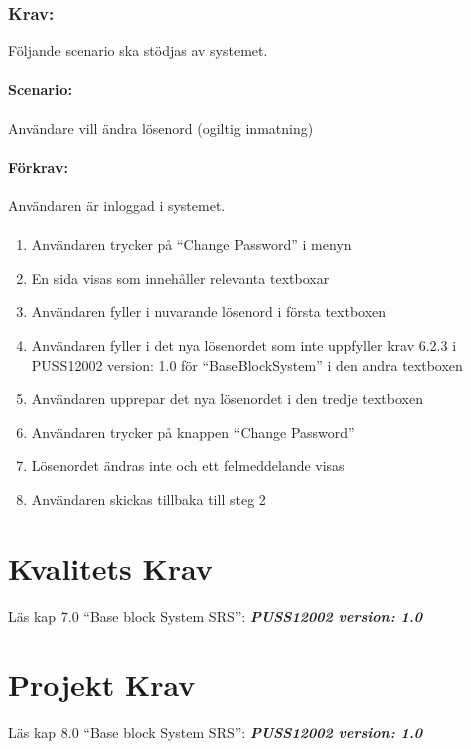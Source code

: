 \documentclass[paper=a4, fontsize=11pt,twoside]{article}
\begin{document}
	\subsubsection{Krav:}Följande scenario ska stödjas av systemet.
	\paragraph{Scenario:}Användare vill ändra lösenord (ogiltig inmatning)
	\paragraph{Förkrav:}
	Användaren är inloggad i systemet.
	\paragraph{}
	\begin{enumerate}
		\item  Användaren trycker på “Change Password” i menyn
		\item	 En sida visas som innehåller relevanta textboxar
		\item	Användaren fyller i nuvarande lösenord i första textboxen
		\item	Användaren fyller i det nya lösenordet som inte uppfyller krav 6.2.3 i PUSS12002 version: 1.0 för “BaseBlockSystem” i den andra textboxen
		\item	Användaren upprepar det nya lösenordet i den tredje textboxen
		\item	Användaren trycker på knappen “Change Password”
		\item	Lösenordet ändras inte och ett felmeddelande visas
		\item Användaren skickas tillbaka till steg 2
		
	\end{enumerate}
	
	\section{Kvalitets Krav}
	Läs kap 7.0  “Base block System SRS”:   \textbf{\textit{PUSS12002 version: 1.0}} 
	\section{Projekt Krav}
	Läs kap 8.0  “Base block System SRS”:   \textbf{\textit{PUSS12002 version: 1.0}} 
\end{document}
